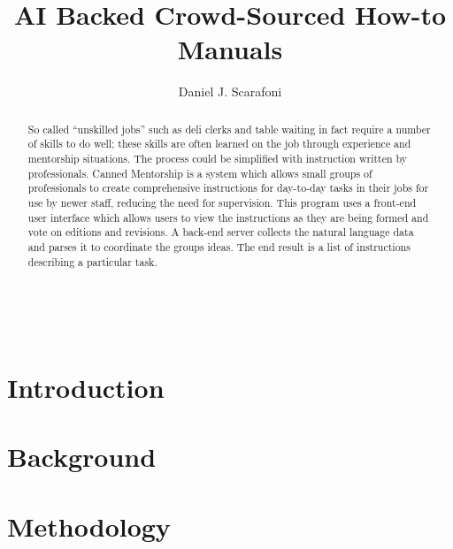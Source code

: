 \documentclass[11pt,leqno]{report}
\begin{document}
\sloppy
\title{AI Backed Crowd-Sourced How-to Manuals}
\author{Daniel J. Scarafoni}
\maketitle


\thispagestyle{empty}
\newenvironment{dedication}
{\cleardoublepage \thispagestyle{empty} \vspace*{\stretch{1}}
  \begin{center} \em}
  {\end{center} \vspace*{\stretch{3}} }


\begin{abstract}
	So called “unskilled jobs” such as deli clerks and table waiting in fact require a number of skills to do well; these skills are often learned on the job through experience and mentorship situations. The process could be simplified with instruction written by professionals. Canned Mentorship is a system which allows small groups of professionals to create comprehensive instructions for day-to-day tasks in their jobs for use by newer staff, reducing the need for supervision. This program uses a front-end user interface which allows users to view the instructions as they are being formed and vote on editions and revisions. A back-end server collects the natural language data and parses it to coordinate the groups ideas. The end result is a list of instructions describing a particular task.
\end{abstract}

\tableofcontents
\pagebreak\

\chapter{Introduction}


\chapter{Background}


\chapter{Methodology}

\end{document}
